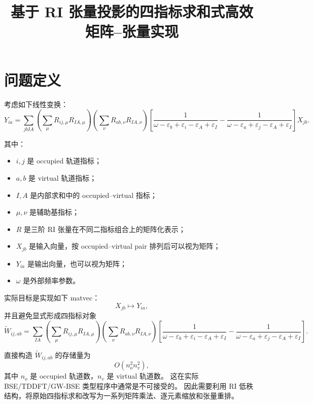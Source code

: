 \documentclass[UTF8,a4paper,11pt]{ctexart}
\title{基于 RI 张量投影的四指标求和式高效矩阵--张量实现}
\author{}
\date{}
\newcommand{\eps}{\varepsilon}
\begin{document}
\maketitle

\section{问题定义}

考虑如下线性变换：
\begin{equation}
Y_{ia}
=
\sum_{jbIA}
\left(
\sum_{\mu} R_{ij,\mu} R_{IA,\mu}
\right)
\left(
\sum_{\nu} R_{ab,\nu} R_{IA,\nu}
\right)
\left[
\frac{1}{
\omega - \eps_b + \eps_i
- \eps_A + \eps_I
}
-
\frac{1}{
\omega - \eps_a + \eps_j
- \eps_A + \eps_I
}
\right]
X_{jb}.
\label{eq:original}
\end{equation}

其中：
\begin{itemize}
  \item $i,j$ 是 occupied 轨道指标；
  \item $a,b$ 是 virtual 轨道指标；
  \item $I,A$ 是内部求和中的 occupied--virtual 指标；
  \item $\mu,\nu$ 是辅助基指标；
  \item $R$ 是三阶 RI 张量在不同二指标组合上的矩阵化表示；
  \item $X_{jb}$ 是输入向量，按 occupied--virtual pair 排列后可以视为矩阵；
  \item $Y_{ia}$ 是输出向量，也可以视为矩阵；
  \item $\omega$ 是外部频率参数。
\end{itemize}

实际目标是实现如下 matvec：
\begin{equation}
X_{jb} \longmapsto Y_{ia},
\end{equation}
并且避免显式形成四指标对象
\begin{equation}
\widetilde W_{ij,ab}
=
\sum_{IA}
\left(
\sum_{\mu} R_{ij,\mu} R_{IA,\mu}
\right)
\left(
\sum_{\nu} R_{ab,\nu} R_{IA,\nu}
\right)
\left[
\frac{1}{
\omega - \eps_b + \eps_i
- \eps_A + \eps_I
}
-
\frac{1}{
\omega - \eps_a + \eps_j
- \eps_A + \eps_I
}
\right].
\end{equation}

直接构造 $\widetilde W_{ij,ab}$ 的存储量为
\begin{equation}
O(n_o^2 n_v^2),
\end{equation}
其中 $n_o$ 是 occupied 轨道数，$n_v$ 是 virtual 轨道数。
这在实际 BSE/TDDFT/GW-BSE 类型程序中通常是不可接受的。
因此需要利用 RI 低秩结构，将原始四指标求和改写为一系列矩阵乘法、逐元素缩放和张量重排。
\end{document}
